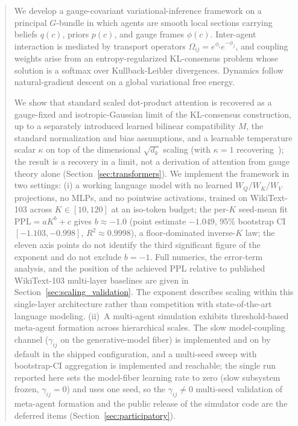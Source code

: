 \documentclass[11pt]{article}
\begin{document}
\begin{abstract}
We develop a gauge-covariant variational-inference framework on a principal $G$-bundle in which agents are smooth local sections carrying beliefs $q(c)$, priors $p(c)$, and gauge frames $\phi(c)$. Inter-agent interaction is mediated by transport operators $\Omega_{ij} = e^{\phi_i} e^{-\phi_j}$, and coupling weights arise from an entropy-regularized KL-consensus problem whose solution is a softmax over Kullback-Leibler divergences. Dynamics follow natural-gradient descent on a global variational free energy.

We show that standard scaled dot-product attention is recovered as a gauge-fixed and isotropic-Gaussian limit of the KL-consensus construction, up to a separately introduced learned bilinear compatibility $M$, the standard normalization and bias assumptions, and a learnable temperature scalar $\kappa$ on top of the dimensional $\sqrt{d_k}$ scaling (with $\kappa = 1$ recovering~\cite{vaswani2017attention}); the result is a recovery in a limit, not a derivation of attention from gauge theory alone (Section~\ref{sec:transformers}). We implement the framework in two settings: (i) a working language model with no learned $W_Q/W_K/W_V$ projections, no MLPs, and no pointwise activations, trained on WikiText-103 across $K \in [10,120]$ at an iso-token budget; the per-$K$ seed-mean fit $\mathrm{PPL} = aK^b + c$ gives $b \approx -1.0$ (point estimate $-1.049$, 95\% bootstrap CI $[-1.103, -0.998]$, $R^2 \approx 0.9998$), a floor-dominated inverse-$K$ law; the eleven axis points do not identify the third significant figure of the exponent and do not exclude $b = -1$. Full numerics, the error-term analysis, and the position of the achieved PPL relative to published WikiText-103 multi-layer baselines are given in Section~\ref{sec:scaling_validation}. The exponent describes scaling within this single-layer architecture rather than competition with state-of-the-art language modeling. (ii)~A multi-agent simulation exhibits threshold-based meta-agent formation across hierarchical scales. The slow model-coupling channel ($\gamma_{ij}$ on the generative-model fiber) is implemented and on by default in the shipped configuration, and a multi-seed sweep with bootstrap-CI aggregation is implemented and reachable; the single run reported here sets the model-fiber learning rate to zero (slow subsystem frozen, $\gamma_{ij} = 0$) and uses one seed, so the $\gamma_{ij} \neq 0$ multi-seed validation of meta-agent formation and the public release of the simulator code are the deferred items (Section~\ref{sec:participatory}).


\end{abstract}
\end{document}
